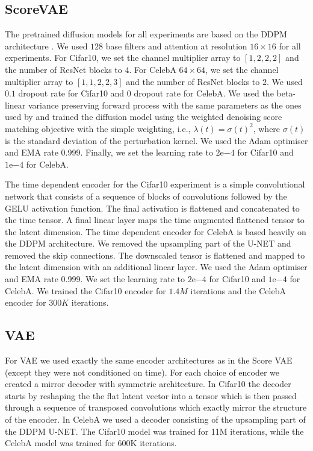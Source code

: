\subsection{ScoreVAE}
The pretrained diffusion models for all experiments are based on the DDPM architecture \cite{ddpm}. We used $128$ base filters and attention at resolution $16\times 16$ for all experiments. For Cifar10, we set the channel multiplier array to $[1, 2, 2, 2]$ and the number of ResNet blocks to $4$. For CelebA $64\times 64$, we set the channel multiplier array to $[1, 1, 2, 2, 3]$ and the number of ResNet blocks to $2$. We used $0.1$ dropout rate for Cifar10 and $0$ dropout rate for CelebA. We used the beta-linear variance preserving forward process with the same parameters as the ones used by \cite{song2020score} and trained the diffusion model using the weighted denoising score matching objective with the simple weighting, i.e., $\lambda(t)=\sigma(t)^2$, where $\sigma(t)$ is the standard deviation of the perturbation kernel. We used the Adam optimiser and EMA rate 0.999. Finally, we set the learning rate to $2\mathrm{e}{-4}$ for Cifar10 and $1\mathrm{e}{-4}$ for CelebA.

The time dependent encoder for the Cifar10 experiment is a simple convolutional network that consists of a sequence of blocks of convolutions followed by the GELU activation function. The final activation is flattened and concatenated to the time tensor. A final linear layer maps the time augmented flattened tensor to the latent dimension. The time dependent encoder for CelebA is based heavily on the DDPM architecture. We removed the upsampling part of the U-NET and removed the skip connections. The downscaled tensor is flattened and mapped to the latent dimension with an additional linear layer. We used the Adam optimiser and EMA rate 0.999. We set the learning rate to $2\mathrm{e}{-4}$ for Cifar10 and $1\mathrm{e}{-4}$ for CelebA. We trained the Cifar10 encoder for $1.4M$ iterations and the CelebA encoder for $300K$ iterations.

\subsection{VAE}

For VAE we used exactly the same encoder architectures as in the Score VAE (except they were not conditioned on time). For each choice of encoder we created a mirror decoder with symmetric architecture. In Cifar10 the decoder starts by reshaping the the flat latent vector into a tensor which is then passed through a sequence of transposed convolutions which exactly mirror the structure of the encoder. In CelebA we used a decoder consisting of the upsampling part of the DDPM U-NET. The Cifar10 model was trained for 11M iterations, while the CelebA model was trained for 600K iterations.



